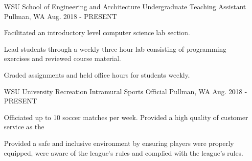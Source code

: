 \begin{cventries}
  \cventry
    {WSU School of Engineering and Architecture}
    {Undergraduate Teaching Assistant}
    {Pullman, WA}
    {Aug. 2018 - PRESENT}
    {
      \begin{cvitems}
        \item {Facilitated an introductory level computer science lab section.}
        \item{Lead students through a weekly three-hour lab consisting of programming exercises and reviewed course material.}
        \item {Graded assignments and held office hours for students weekly.}
      \end{cvitems}
    }
  \cventry
    {WSU University Recreation}
    {Intramural Sports Official}
    {Pullman, WA}
    {Aug. 2018 - PRESENT}
    {
      \begin{cvitems}
        \item {Officiated up to 10 soccer matches per week. Provided a high quality of customer service as the }
        \item {Provided a safe and inclusive environment by ensuring players were properly equipped, were aware of the league's rules and complied with the league's rules.}
      \end{cvitems}
    }
    
\end{cventries}